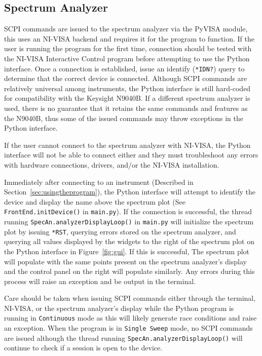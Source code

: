 \documentclass[titlepage]{article}
\begin{document}
\subsection{Spectrum Analyzer}\label{sec:commssa}
SCPI commands are issued to the spectrum analyzer via the PyVISA module, this uses an NI-VISA backend and requires it for the program to function. If the user is running the program for the first time, connection should be tested with the NI-VISA Interactive Control program before attempting to use the Python interface. Once a connection is established, issue an identify (\verb|*IDN?|) query to determine that the correct device is connected. Although SCPI commands are relatively universal among instruments, the Python interface is still hard-coded for compatibility with the Keysight N9040B. If a different spectrum analyzer is used, there is no guarantee that it retains the same commands and features as the N9040B, thus some of the issued commands may throw exceptions in the Python interface. 

If the user cannot connect to the spectrum analyzer with NI-VISA, the Python interface will not be able to connect either and they must troubleshoot any errors with hardware connections, drivers, and/or the NI-VISA installation.

Immediately after connecting to an instrument (Described in Section~\ref{sec:usingtheprogram}), the Python interface will attempt to identify the device and display the name above the spectrum plot (See \verb|FrontEnd.initDevice()| in \verb|main.py|). If the connection is successful, the thread running \verb|SpecAn.analyzerDisplayLoop()| in \verb|main.py| will initialize the spectrum plot by issuing \verb|*RST|, querying errors stored on the spectrum analyzer, and querying all values displayed by the widgets to the right of the spectrum plot on the Python interface in Figure~\ref{fig:gui}. If this is successful, The spectrum plot will populate with the same points present on the spectrum analyzer's display and the control panel on the right will populate similarly. Any errors during this process will raise an exception and be output in the terminal.

Care should be taken when issuing SCPI commands either through the terminal, NI-VISA, or the spectrum analyzer's display while the Python program is running in \verb|Continuous| mode as this will likely generate race conditions and raise an exception. When the program is in \verb|Single Sweep| mode, no SCPI commands are issued although the thread running \verb|SpecAn.analyzerDisplayLoop()| will continue to check if a session is open to the device.
\end{document}

